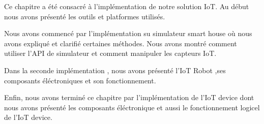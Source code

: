 Ce chapitre a été consacré à l'implémentation de notre solution IoT. Au début nous avons présenté les outils et platformes utilisés.

Nous avons commencé par l'implémentation su simulateur smart house où nous avons expliqué et clarifié certaines méthodes. Nous avons montré comment utiliser l'API de simulateur et comment manipuler les capteurs IoT.

Dans la seconde implémentation , nous avons présenté l'IoT Robot ,ses composants éléctroniques et son fonctionnement.

Enfin, nous avons terminé ce chapitre par l'implémentation de l'IoT device dont nous avons présenté les composants éléctronique et aussi le fonctionnement logicel de l'IoT device.


